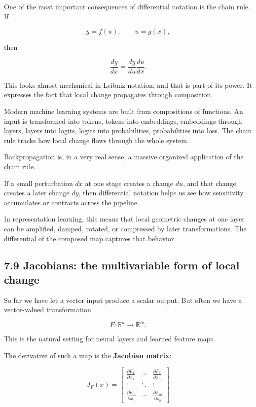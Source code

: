 One of the most important consequences of differential notation is the
chain rule. If

\[
y=f(u), \qquad u=g(x),
\]

then

\[ 
\frac{dy}{dx}=\frac{dy}{du}\frac{du}{dx}.
\]

This looks almost mechanical in Leibniz notation, and that is part of
its power. It expresses the fact that local change propagates through
composition.

Modern machine learning systems are built from compositions of
functions. An input is transformed into tokens, tokens into embeddings,
embeddings through layers, layers into logits, logits into
probabilities, probabilities into loss. The chain rule tracks how local
change flows through the whole system.

Backpropagation is, in a very real sense, a massive organized
application of the chain rule.

If a small perturbation \(dx\) at one stage creates a change \(du\), and
that change creates a later change \(dy\), then differential notation
helps us see how sensitivity accumulates or contracts across the
pipeline.

In representation learning, this means that local geometric changes at
one layer can be amplified, damped, rotated, or compressed by later
transformations. The differential of the composed map captures that
behavior.

\hypertarget{jacobians-the-multivariable-form-of-local-change}{%
\subsection{7.9 Jacobians: the multivariable form of local
change}\label{jacobians-the-multivariable-form-of-local-change}}

So far we have let a vector input produce a scalar output. But often we
have a vector-valued transformation

\[ 
F:\mathbb{R}^n \to \mathbb{R}^m.
\]

This is the natural setting for neural layers and learned feature maps.

The derivative of such a map is the \textbf{Jacobian matrix}:

\[ 
J_F(x)=
\begin{bmatrix}
\frac{\partial F_1}{\partial x_1} & \cdots & \frac{\partial F_1}{\partial x_n}\\
\vdots & \ddots & \vdots\\
\frac{\partial F_m}{\partial x_1} & \cdots & \frac{\partial F_m}{\partial x_n}
\end{bmatrix}
\]

